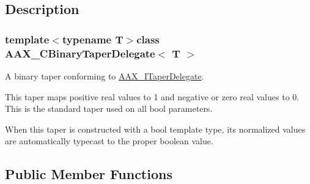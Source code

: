 \subsection{Description}
\subsubsection*{template$<$typename T$>$class A\+A\+X\+\_\+\+C\+Binary\+Taper\+Delegate$<$ T $>$}

A binary taper conforming to \hyperlink{a00114}{A\+A\+X\+\_\+\+I\+Taper\+Delegate}. 

This taper maps positive real values to 1 and negative or zero real values to 0. This is the standard taper used on all bool parameters.

When this taper is constructed with a bool template type, its normalized values are automatically typecast to the proper boolean value. \subsection*{Public Member Functions}
